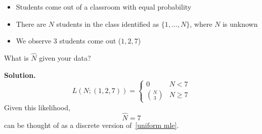 \begin{exbox}
    \begin{example} $ \; $
        \begin{itemize}
            \item Students come out of a classroom with equal probability
            \item There are $ N $ students in the class identified as $ \{1,\ldots ,N\} $, where
                  $ N $ is unknown
            \item We observe $ 3 $ students come out ($ 1,2,7 $)
        \end{itemize}
        What is $ \hat{N} $ given your data?
        
        \textbf{Solution.}
        \[ L(N;(1,2,7))=
            \begin{cases}
                0            & N<7          \\
                \binom{N}{3} & N\geqslant 7
            \end{cases} \]
        Given this likelihood,
        \[ \hat{N}=7 \]
        can be thought of as a discrete version of~\ref{uniform mle}.
    \end{example}
\end{exbox}

